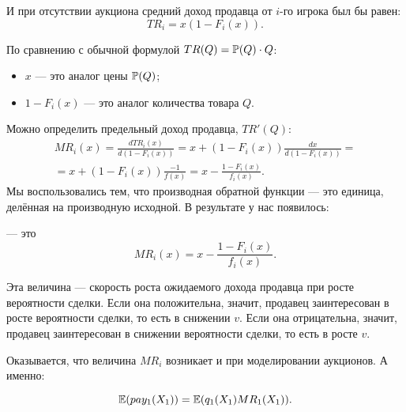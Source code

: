 И при отсутствии аукциона средний доход продавца от $ i $-го игрока был бы равен:
\begin{equation}
TR_{i}=x(1-F_{i}(x)).
\end{equation}

По сравнению с обычной формулой $ TR(Q)=\P(Q)\cdot Q $:
\begin{itemize}
\item $ x $ — это аналог цены $ \P(Q) $;
\item $ 1-F_{i}(x) $ — это аналог количества товара $ Q $.
\end{itemize}

Можно определить предельный доход продавца, $ TR'(Q) $:
\begin{multline}
MR_{i}(x)=\frac{d TR_{i}(x)}{d(1-F_{i}(x))}=x+(1-F_{i}(x))\frac{dx}{d(1-F_{i}(x))}=\\
=x+(1-F_{i}(x))\frac{-1}{f(x)}=x-\frac{1-F_{i}(x)}{f_{i}(x)}.
\end{multline}
Мы воспользовались тем, что производная обратной функции — это единица, делённая на производную исходной.
В результате у нас появилось:
\begin{mydef}
 — это
\begin{equation}
MR_{i}(x)=x-\frac{1-F_{i}(x)}{f_{i}(x)}.
\end{equation}
\end{mydef}

Эта величина — скорость роста ожидаемого дохода продавца при росте вероятности сделки. Если она положительна, значит, продавец заинтересован в росте вероятности сделки, то есть в снижении $ v $. Если она отрицательна, значит, продавец заинтересован в снижении вероятности сделки, то есть в росте $ v $.

Оказывается, что величина $ MR_{i} $ возникает и при моделировании аукционов. А именно:

\begin{myth}
\begin{equation}
\E(pay_{1}(X_{1}))=\E(q_{1}(X_{1})MR_{1}(X_{1})).
\end{equation}
\end{myth}

